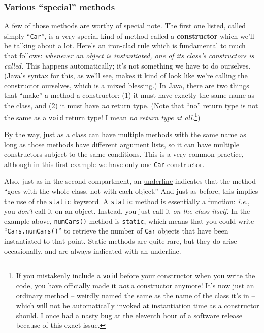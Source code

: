 \subsubsection{Various ``special'' methods}
\label{page:instantiateConstructor}

A few of those methods are worthy of special note. The first one listed,
called simply ``\texttt{Car}'', is a very special kind of method called a
\textbf{constructor} which we'll be talking about a lot. Here's an iron-clad
rule which is fundamental to much that follows: \textit{whenever an object is
instantiated, one of its class's constructors is called.} This happens
automatically; it's not something we have to do ourselves. (Java's syntax for
this, as we'll see, makes it kind of look like we're calling the constructor
ourselves, which is a mixed blessing.) In Java, there are two things that
``make'' a method a constructor: (1) it must have exactly the same name as the
class, and (2) it must have \textit{no} return type. (Note that ``no'' return
type is not the same as a \texttt{void} return type! I mean \textit{no return
type at all.}\footnote{If you mistakenly include a \texttt{void} before your
constructor when you write the code, you have officially made it \textit{not}
a constructor anymore! It's now just an ordinary method -- weirdly named the
same as the name of the class it's in -- which will not be automatically
invoked at instantiation time as a constructor should. I once had a nasty bug
at the eleventh hour of a software release because of this exact issue.})

By the way, just as a class can have multiple methods with the same name as
long as those methods have different argument lists, so it can have multiple
constructors subject to the same conditions. This is a very common practice,
although in this first example we have only one \texttt{Car} constructor.

Also, just as in the second compartment, an \underline{underline} indicates
that the method ``goes with the whole class, not with each object.'' And just
as before, this implies the use of the \texttt{static} keyword. A
\texttt{static} method is essentially a function: \textit{i.e.}, you
\textit{don't} call it on an object. Instead, you just call it \textit{on the
class itself.} In the example above, \texttt{numCars()} method is
\texttt{static}, which means that you could write ``\texttt{Cars.numCars()}''
to retrieve the number of \texttt{Car} objects that have been instantiated to
that point. Static methods are quite rare, but they do arise occasionally, and
are always indicated with an underline.

